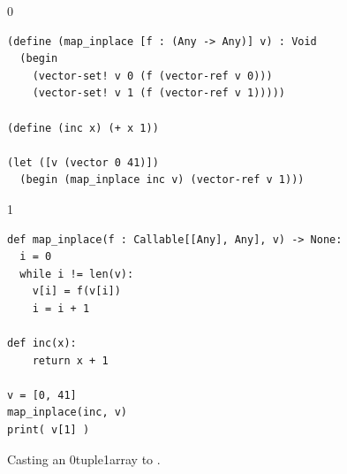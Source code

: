 \documentclass[7x10]{TimesAPriori_MIT}%
\def\racketEd{0}
\def\pythonEd{1}
\def\edition{0}
\newcommand{\racket}[1]{{\if\edition\racketEd{#1}\fi}}
\newcommand{\python}[1]{{\if\edition\pythonEd #1\fi}}
\numberwithin{theorem}{chapter}
\numberwithin{definition}{chapter}
\numberwithin{equation}{chapter}
\begin{document}
\begin{figure}[tbp]
  \begin{tcolorbox}[colback=white]
{\if\edition\racketEd
\begin{lstlisting}
(define (map_inplace [f : (Any -> Any)] v) : Void
  (begin
    (vector-set! v 0 (f (vector-ref v 0)))
    (vector-set! v 1 (f (vector-ref v 1)))))

(define (inc x) (+ x 1))

(let ([v (vector 0 41)])
  (begin (map_inplace inc v) (vector-ref v 1)))
\end{lstlisting}
\fi}
{\if\edition\pythonEd
\begin{lstlisting}
def map_inplace(f : Callable[[Any], Any], v) -> None:
  i = 0
  while i != len(v):
    v[i] = f(v[i])
    i = i + 1

def inc(x):
    return x + 1

v = [0, 41]
map_inplace(inc, v)
print( v[1] )
\end{lstlisting}
\fi}
  \end{tcolorbox}

  \caption{Casting an \racket{tuple}\python{array} to \CANYTY{}.}
\label{fig:map-any}
\end{figure}
\end{document}

